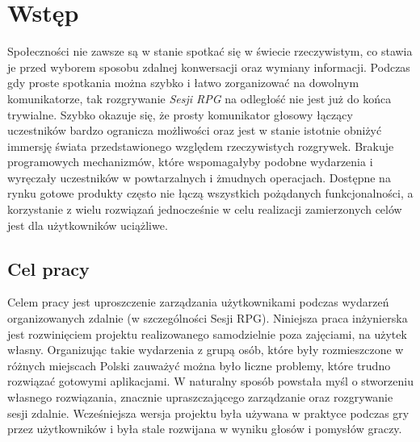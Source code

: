 \documentclass[shortabstract,inz]{iithesis}
\author{Mateusz Zając}
\begin{document}
	\chapter*{Wstęp}
		Społeczności nie zawsze są w stanie spotkać się w świecie rzeczywistym, co stawia je przed wyborem sposobu zdalnej konwersacji oraz wymiany informacji. Podczas gdy proste spotkania można szybko i łatwo zorganizować na dowolnym komunikatorze, tak rozgrywanie \textit{Sesji RPG}\cite{sesjarpg} na odległość nie jest już do końca trywialne. Szybko okazuje się, że prosty komunikator głosowy łączący uczestników bardzo ogranicza możliwości oraz jest w stanie istotnie obniżyć immersję świata przedstawionego względem rzeczywistych rozgrywek. Brakuje programowych mechanizmów, które wspomagałyby podobne wydarzenia i wyręczały uczestników w powtarzalnych i żmudnych operacjach. Dostępne na rynku gotowe produkty często nie łączą wszystkich pożądanych funkcjonalności, a korzystanie z wielu rozwiązań jednocześnie w celu realizacji zamierzonych celów jest dla użytkowników uciążliwe. 
		
		\section*{Cel pracy}
		Celem pracy jest uproszczenie zarządzania użytkownikami podczas wydarzeń organizowanych zdalnie (w szczególności Sesji RPG).
		Niniejsza praca inżynierska jest rozwinięciem projektu realizowanego samodzielnie poza zajęciami, na użytek własny. Organizując takie wydarzenia z grupą osób, które były rozmieszczone w różnych miejscach Polski zauważyć można było liczne problemy, które trudno rozwiązać gotowymi aplikacjami. W naturalny sposób powstała myśl o stworzeniu własnego rozwiązania, znacznie upraszczającego zarządzanie oraz rozgrywanie sesji zdalnie. Wcześniejsza wersja projektu była używana w praktyce podczas gry przez użytkowników i była stale rozwijana w wyniku głosów i pomysłów graczy.
		
\end{document}
